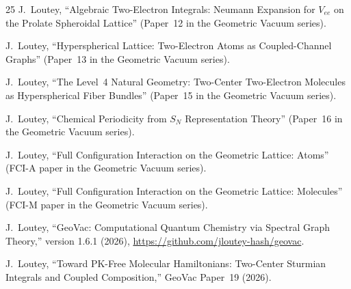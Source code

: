 \documentclass[aps,pra,twocolumn,superscriptaddress,longbibliography,floatfix]{revtex4-2}
\begin{document}
\begin{thebibliography}{25}
J.~Loutey,
``Algebraic Two-Electron Integrals: Neumann Expansion
for $V_{ee}$ on the Prolate Spheroidal Lattice''
(Paper~12 in the Geometric Vacuum series).

J.~Loutey,
``Hyperspherical Lattice: Two-Electron Atoms as
Coupled-Channel Graphs''
(Paper~13 in the Geometric Vacuum series).

J.~Loutey,
``The Level~4 Natural Geometry: Two-Center Two-Electron Molecules
as Hyperspherical Fiber Bundles''
(Paper~15 in the Geometric Vacuum series).

J.~Loutey,
``Chemical Periodicity from $S_N$ Representation Theory''
(Paper~16 in the Geometric Vacuum series).

J.~Loutey,
``Full Configuration Interaction on the Geometric Lattice: Atoms''
(FCI-A paper in the Geometric Vacuum series).

J.~Loutey,
``Full Configuration Interaction on the Geometric Lattice: Molecules''
(FCI-M paper in the Geometric Vacuum series).

J.~Loutey,
``GeoVac: Computational Quantum Chemistry via Spectral Graph Theory,''
version 1.6.1 (2026),
\url{https://github.com/jloutey-hash/geovac}.

J.~Loutey,
``Toward PK-Free Molecular Hamiltonians: Two-Center Sturmian
Integrals and Coupled Composition,''
GeoVac Paper~19 (2026).

\end{thebibliography}
\end{document}
